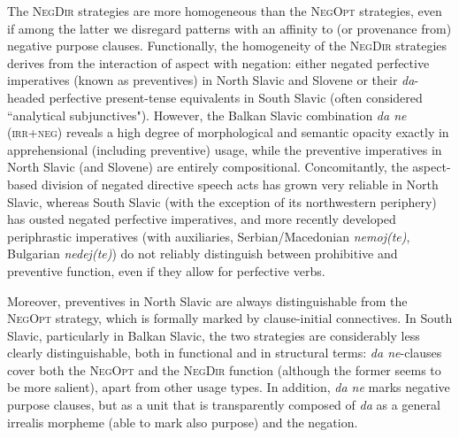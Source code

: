 \documentclass[output=paper,colorlinks,citecolor=brown]{langscibook}
\begin{document}
The \textsc{NegDir} strategies are more homogeneous than the \textsc{NegOpt} strategies, even if among the latter we disregard patterns with an affinity to (or provenance from) negative purpose clauses. Functionally, the homogeneity of the \textsc{NegDir} strategies derives from the interaction of aspect with negation: either negated perfective imperatives (known as preventives) in North Slavic and Slovene or their \textit{da}-headed perfective present-tense equivalents in South Slavic (often considered ``analytical subjunctives"). However, the Balkan Slavic combination \textit{da ne} (\textsc{irr+neg}) reveals a high degree of morphological and semantic opacity exactly in apprehensional (including preventive) usage, while the preventive imperatives in North Slavic (and Slovene) are entirely compositional. Concomitantly, the aspect-based division of negated directive speech acts has grown very reliable in North Slavic, whereas South Slavic (with the exception of its northwestern periphery) has ousted negated perfective imperatives, and more recently developed periphrastic imperatives (with auxiliaries, Serbian/Macedonian \textit{nemoj(te)}, Bulgarian \textit{nedej(te)}) do not reliably distinguish between prohibitive and preventive function, even if they allow for perfective verbs.

Moreover, preventives in North Slavic are always distinguishable from the \textsc{Neg}\textsc{Opt} strategy, which is formally marked by clause-initial connectives. In South Slavic, particularly in Balkan Slavic, the two strategies are considerably less clearly distinguishable, both in functional and in structural terms: \textit{da ne}-clauses cover both the \textsc{NegOpt} and the \textsc{NegDir} function (although the former seems to be more salient), apart from other usage types. In addition, \textit{da ne} marks negative purpose clauses, but as a unit that is transparently composed of \textit{da} as a general irrealis morpheme (able to mark also purpose) and the negation.
\end{document}
